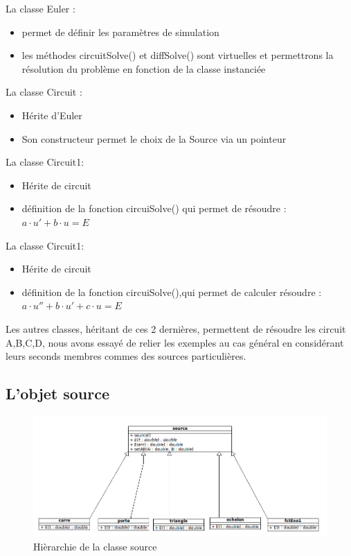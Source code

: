 \documentclass[a4paper,11pt]{article}
\begin{document}
\noindent La classe Euler :
\begin{itemize}
 \item permet de définir les paramètres de simulation
  \item les méthodes circuitSolve() et diffSolve() sont virtuelles et permettrons la résolution du problème en fonction de la classe instanciée
\end{itemize}
La classe Circuit :
\begin{itemize}
 \item Hérite d'Euler
  \item Son constructeur permet le choix de la Source via un pointeur
\end{itemize}
La classe Circuit1:
\begin{itemize}
 \item Hérite de circuit
  \item définition de la fonction circuiSolve() qui permet de résoudre : $a \cdot u'+ b \cdot u = E$  
\end{itemize}
La classe Circuit1:
\begin{itemize}
 \item Hérite de circuit
  \item définition de la fonction circuiSolve(),qui permet de calculer résoudre : $ a\cdot u''+ b \cdot u'+c \cdot u = E$  \\
\end{itemize}

\noindent Les autres classes, héritant de ces 2 dernières, permettent de résoudre les circuit A,B,C,D, nous avons essayé de relier les exemples 
au cas général en considérant leurs seconds membres commes des sources particulières. \\

  \subsection{L'objet source}
    \begin{figure}[H]
	 \begin{center}
	\includegraphics[scale=.5]{sourceDiagram}
	\caption{Hièrarchie de la classe source}
	\end{center}
      \end{figure}
\end{document}
